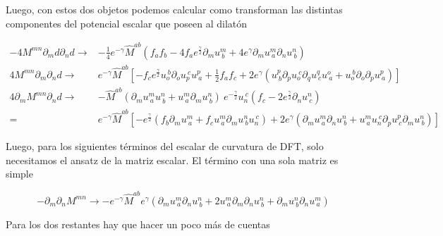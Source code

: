 \documentclass{article}
\numberwithin{equation}{section}
\begin{document}
Luego, con estos dos objetos podemos calcular como transforman las distintas componentes del potencial escalar que poseen al dilatón

\begin{equation}\label{V123}
\begin{aligned}
-4M^{m n} \partial_m d \partial_n d \longrightarrow& -\frac{1}{4} e^{-\gamma} \hat{M}^{a b} \left( f_a f_b - 4 f_a e^{\frac{\gamma}{2}} \partial_m u^{m}_{\ b} + 4e^{\gamma} \partial_m u^{m}_{\ a} \partial_n u^{n}_{\ b} \right)\\
4 M^{m n}\partial_m \partial_n d \longrightarrow& e^{-\gamma}\hat{M}^{a b} \left[ -f_c e^{\frac{\gamma}{2}} u_{o}^{\ b} \partial_o u_{p}^{\ c} u^{p}_{\ a} + \frac{1}{2} f_a f_c + 2 e^{\gamma} \left( u^{p}_{\ b} \partial_p u_{o}^{\ c} \partial_q u^{q}_{\ c} u^{o}_{\ a} + u_{o}^{\ b} \partial_o \partial_p u^{p}_{\ a} \right)\right]\\
4 \partial_m M^{m n} \partial_n d \longrightarrow& -\hat{M}^{a b} \left( \partial_m u^{m}_{\ a} u^{n}_{\ b} + u^{m}_{\ a} \partial_m u^{n}_{\ b}\right) \ e^{-\frac{\gamma}{2}}  u_{n}^{\ c} \left( f_c  -2 e^{\frac{\gamma}{2}} \partial_n u^{n}_{\ c} \right)\\
=& e^{-\gamma}\hat{M}^{a b} \left[ -e^{\frac{\gamma}{2}} \left( f_b \partial_m u^{m}_{\ a} + f_c u^{m}_{\ a} \partial_m u^{n}_{\ b} u_{n}^{\ c} \right) + 2 e^{\gamma} \left( \partial_m u^{m}_{\ a} \partial_n u^{n}_{\ b} + u^{m}_{\ a} u_{n}^{\ c} \partial_p u^{p}_{\ c} \partial_m u^{n}_{\ b} \right) \right]
\end{aligned}
\end{equation}

Luego, para los siguientes términos del escalar de curvatura de DFT, solo necesitamos el ansatz de la matriz escalar. El término con una sola matriz es simple

\begin{equation}\label{V4}
-\partial_m \partial_n M^{m n} \longrightarrow - e^{- \gamma} \hat{M}^{a b} e^{\gamma} \left( \partial_m u^{m}_{\ a} \partial_n u^{n}_{\ b} + 2  u^{m}_{\ a} \partial_m \partial_n u^{n}_{\ b} + \partial_m u^{n}_{\ b} \partial_n u^{m}_{\ a} \right)
\end{equation}

Para los dos restantes hay que hacer un poco más de cuentas
\end{document}
